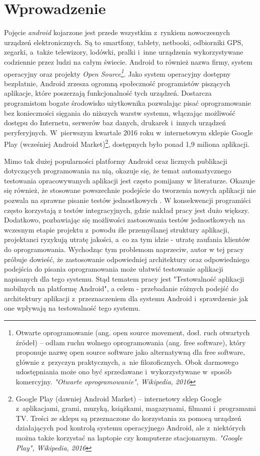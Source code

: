\chapter{Wprowadzenie}
\label{wstep}

Pojęcie \textit{android} kojarzone jest przede wszystkim z~rynkiem nowoczesnych urządzeń elektronicznych. Są to smartfony, tablety, netbooki, odbiorniki GPS, zegarki, a~także telewizory, lodówki, pralki i~inne urządzenia wykorzystywane codziennie przez ludzi na całym świecie. Android to również nazwa firmy, system operacyjny oraz projekty \textit{Open Source\footnote{Otwarte oprogramowanie (ang. open source movement, dosł. ruch otwartych źródeł) – odłam ruchu wolnego oprogramowania (ang. free software), który proponuje nazwę open source software jako alternatywną dla free software, głównie z~przyczyn praktycznych, a~nie filozoficznych. Obok darmowego udostępniania może ono być sprzedawane i~wykorzystywane w~sposób komercyjny. \textit{"Otwarte oprogramowanie", Wikipedia, 2016}}}. Jako system operacyjny dostępny bezpłatnie, Android zrzesza ogromną społeczność programistów piszących aplikacje, które poszerzają funkcjonalność tych urządzeń. Dostarcza programistom bogate środowisko użytkownika pozwalając pisać oprogramowanie bez konieczności sięgania do niższych warstw systemu, włączając możliwość dostępu do Internetu, serwerów baz danych, drukarek i~innych urządzeń peryferyjnych. W~pierwszym kwartale 2016 roku w~internetowym sklepie Google Play (wcześniej Android Market)\footnote{Google Play (dawniej Android Market) – internetowy sklep Google z~aplikacjami, grami, muzyką, książkami, magazynami, filmami i~programami TV. Treści ze sklepu są przeznaczone do korzystania za pomocą urządzeń działających pod kontrolą systemu operacyjnego Android, ale z~niektórych można także korzystać na laptopie czy komputerze stacjonarnym. \textit{"Google Play", Wikipedia, 2016}}, dostępnych było ponad 1,9 miliona aplikacji. 

Mimo tak dużej popularności platformy Android oraz licznych publikacji dotyczących programowania na nią, okazuje się, że temat automatycznego testowania opracowywanych aplikacji jest często pomijamy w literaturze. Okazuje się również, że stosowane powszechnie podejście do tworzenia nowych aplikacji nie pozwala na sprawne pisanie testów jednostkowych \cite{tematpracy}. W konsekwencji programiści często korzystają z testów integracyjnych, gdzie nakład pracy jest dużo większy. Dodatkowo, pozbawiając się możliwości zastosowania testów jednostkowych na wczesnym etapie projektu z~powodu źle przemyślanej struktury aplikacji, projektanci ryzykują utratę jakości, a~co za tym idzie - utratę zaufania klientów do oprogramowania. Wychodząc tym problemom naprzeciw, autor w tej pracy próbuje dowieść, że zastosowanie odpowiedniej architektury oraz odpowiedniego podejścia do pisania oprogramowania może ułatwić testowanie aplikacji napisanych dla tego systemu. Stąd tematem pracy jest "Testowalność aplikacji mobilnych na platformę Android", a celem - przebadanie różnych podejść do architektury aplikacji z~przeznaczeniem dla systemu Android i~sprawdzenie jak one wpływają na testowalność tego systemu. 

